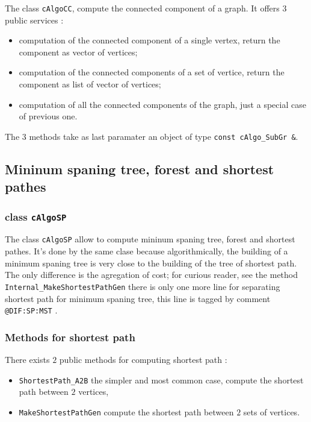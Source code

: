 The class {\tt cAlgoCC}, compute the connected component of a graph. It offers $3$ public services :

\begin{itemize}
    \item computation of the connected component of a single vertex, return the component as vector of vertices;

    \item computation of the connected components of a set of vertice, return the component as list of vector of vertices;

    \item computation of all the connected components of the graph, just a special case of previous one.
\end{itemize}

The $3$ methods take as last paramater an object of type {\tt const cAlgo\_SubGr \&}.



\subsection{Mininum spaning tree, forest and shortest pathes}

\subsubsection{class {\tt cAlgoSP}}

The class {\tt cAlgoSP} allow to compute mininum spaning tree, forest and shortest pathes.
It's done by the same clase because algorithmically, the building of a minimum spaning tree
is very close to the building of the tree of shortest path. 
The only difference is the agregation of cost; for curious reader, see the
method {\tt Internal\_MakeShortestPathGen} there is only one more line for
separating shortest path for minimum spaning tree, this line is tagged by comment {\tt  @DIF:SP:MST} .


\subsubsection{Methods for shortest path}

There  exists  $2$ public methods for computing shortest path :

\begin{itemize}
    \item {\tt ShortestPath\_A2B} the simpler and most common case,
          compute the shortest path between $2$ vertices,

    \item {\tt MakeShortestPathGen} compute the shortest path between $2$ sets of vertices.
\end{itemize}



